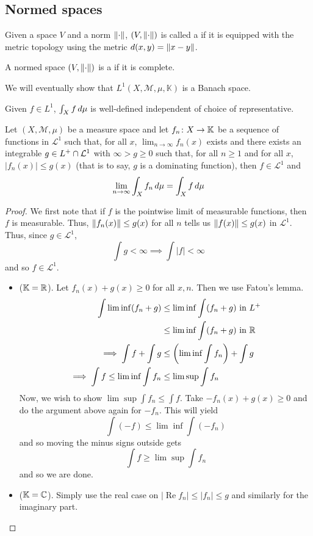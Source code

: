 \documentclass[11pt,leqno,oneside]{amsbook}
\numberwithin{thm}{section}
\newcommand{\M}{\mathcal{M}} %
\newcommand{\cL}{\mathcal{L}}
\newcommand{\K}{\mathbb{K}} %
\begin{document}
\subsection{Normed spaces}
\begin{defn}
  Given a space \(V\) and a norm \(\norm\),  \((V,\norm)\) is called a
   if it is equipped with the metric topology using
  the metric \(d(x,y) = \norm[x-y]\).
\end{defn}
\begin{defn}
  A normed space \((V,\norm)\) is a  if it is
  complete.
\end{defn}
We will eventually show that \(L^1(X,\M,\mu,\mathbb{K})\) is a Banach
space.
\begin{rmk}
  Given \(f \in L^1\), \(\int_X f \d\mu\) is well-defined independent
  of choice of representative.
\end{rmk}
\begin{thm}\label{dct-v1}
  Let \((X,\M,\mu)\) be a measure space and let \(f_n \from X \to
  \mathbb{K}\) be a sequence of functions in \(\cL^1\) such that, for
  all \(x\), \(\lim_{n \to \infty} f_n(x)\) exists and there exists an
  integrable \(g \in L^+ \intersect \cL^1\) with \(\infty > g \geq
  0\) such that, for all \(n \geq 1\) and for all \(x\), \(|f_n(x)|
  \leq g(x)\) (that is to say, \(g\) is a dominating function), then
  \(f \in \cL^1\) and \[
    \lim_{n \to \infty} \int_X f_n \d\mu = \int_X f \d\mu
  \]
\end{thm}
\begin{proof}
  We first note that if \(f\) is the pointwise limit of measurable
  functions, then \(f\) is measurable. Thus, \(\norm[f_n(x)] \leq
  g(x)\) for all \(n\) tells us \(\norm[f(x)] \leq g(x)\) in
  \(\cL^1\). Thus, since \(g \in \cL^1\), \[
    \int g < \infty \implies \int |f| < \infty
  \]
  and so \(f \in \cL^1\).
  \begin{itemize}
  \item (\(\K = \R\)). Let \(f_n(x) + g(x) \geq 0\) for all
    \(x,n\). Then we use Fatou's lemma.
    \begin{align*}
      \int \lim \inf (f_n+g)
      & \leq \lim \inf \int (f_n+g) \text{ in }L^+ \\
      & \leq \lim \inf \int (f_n+g) \text{ in }\R \\
      \implies \int f + \int g & \leq \left( \lim \inf \int f_n \right)
      + \int g \\
      \implies \int f \leq \lim \inf \int f_n & \leq \lim \sup \int f_n
    \end{align*}
    Now, we wish to show \(\lim \sup \int f_n \leq \int f\). Take
    \(-f_n(x) + g(x) \geq 0\) and do the argument above again for
    \(-f_n\). This will yield \[
      \int (-f) \leq \lim \inf \int (-f_n)
    \]
    and so moving the minus signs outside gets \[
      \int f \geq \lim \sup \int f_n
    \]
    and so we are done.
  \item (\(\K = \C\)). Simply use the real case on \(|\operatorname{Re}
   f_n| \leq |f_n| \leq g\) and similarly for the imaginary part.
  \end{itemize}
\end{proof}
\end{document}

